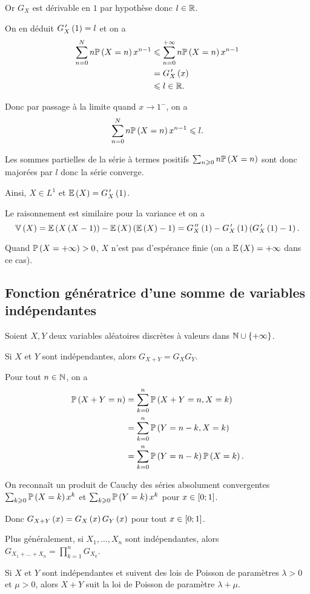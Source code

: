 \begin{dem}
Or \(G_X\) est dérivable en \(1\) par hypothèse donc \(l\in\mathbb{R}\).

On en déduit \(G_X^{\,\prime}\left(1\right)=l\) et on a \[\begin{aligned}
\sum_{n=0}^N n\mathbb{P}\left(X=n\right)x^{n-1}&\leqslant\sum_{n=0}^{+\infty}n\mathbb{P}\left(X=n\right)x^{n-1} \\
&=G_X^{\,\prime}\left(x\right) \\
&\leqslant l\in\mathbb{R}.
\end{aligned}\]

Donc par passage à la limite quand \(x\to1^-\), on a \[\sum_{n=0}^N n\mathbb{P}\left(X=n\right)x^{n-1}\leqslant l.\]

Les sommes partielles de la série à termes positifs \(\sum_{n\geqslant0}n\mathbb{P}\left(X=n\right)\) sont donc majorées par \(l\) donc la série converge.

Ainsi, \(X\in L^1\) et \(\operatorname{\mathbb{E}}\left(X\right)=G_X^{\,\prime}\left(1\right)\).

Le raisonnement est similaire pour la variance et on a \[\operatorname{\mathbb{V}}\left(X\right)=\operatorname{\mathbb{E}}\left(X\left(X-1\right)\right)-\operatorname{\mathbb{E}}\left(X\right)\left(\operatorname{\mathbb{E}}\left(X\right)-1\right)=G_X^{\,\prime\prime}\left(1\right)-G_X^{\,\prime}\left(1\right)\left(G_X^{\,\prime}\left(1\right)-1\right).\]
\end{dem}

Quand \(\mathbb{P}\left(X=+\infty\right)>0\), \(X\) n'est pas d'espérance finie (on a \(\operatorname{\mathbb{E}}\left(X\right)=+\infty\) dans ce cas).

\subsection{Fonction génératrice d'une somme de variables indépendantes}

\begin{prop}
Soient \(X,Y\) deux variables aléatoires discrètes à valeurs dans \(\mathbb{N}\cup\left\lbrace+\infty\right\rbrace\).

Si \(X\) et \(Y\) sont indépendantes, alors \(G_{X+Y}=G_XG_Y\).
\end{prop}

\begin{dem}
Pour tout \(n\in\mathbb{N}\), on a \[\begin{aligned}
\mathbb{P}\left(X+Y=n\right)&=\sum_{k=0}^n\mathbb{P}\left(X+Y=n,X=k\right) \\
&=\sum_{k=0}^n\mathbb{P}\left(Y=n-k,X=k\right) \\
&=\sum_{k=0}^n\mathbb{P}\left(Y=n-k\right)\mathbb{P}\left(X=k\right).
\end{aligned}\]

On reconnaît un produit de Cauchy des séries absolument convergentes \(\sum_{k\geqslant0}\mathbb{P}\left(X=k\right)x^k\) et \(\sum_{k\geqslant0}\mathbb{P}\left(Y=k\right)x^k\) pour \(x\in\left[0;1\right]\).

Donc \(G_{X+Y}\left(x\right)=G_X\left(x\right)G_Y\left(x\right)\) pour tout \(x\in\left[0;1\right]\).
\end{dem}

Plus généralement, si \(X_1,\dots,X_n\) sont indépendantes, alors \(G_{X_1+\dots+X_n}=\prod_{k=1}^nG_{X_k}\).

\begin{ex}
Si \(X\) et \(Y\) sont indépendantes et suivent des lois de Poisson de paramètres \(\lambda>0\) et \(\mu>0\), alors \(X+Y\) suit la loi de Poisson de paramètre \(\lambda+\mu\).
\end{ex}
